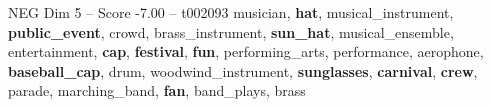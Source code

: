 \begin{textsample}{NEG Dim 5 – Score -7.00 – t002093}  \label{ex:f5_neg_013}
musician, \textbf{hat}, musical\_instrument, \textbf{public\_event}, crowd, brass\_instrument, \textbf{sun\_hat}, musical\_ensemble, entertainment, \textbf{cap}, \textbf{festival}, \textbf{fun}, performing\_arts, performance, aerophone, \textbf{baseball\_cap}, drum, woodwind\_instrument, \textbf{sunglasses}, \textbf{carnival}, \textbf{crew}, parade, marching\_band, \textbf{fan}, band\_plays, brass

\end{textsample}
